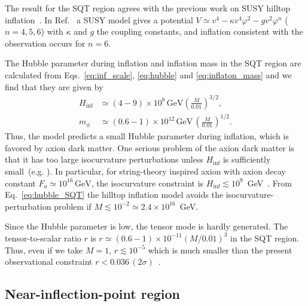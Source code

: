 \documentclass[11pt,a4paper]{article}
\begin{document}
The result for the SQT region agrees with the previous work on SUSY hilltop inflation~\cite{Harigaya:2013pla}.
In Ref.~\cite{Harigaya:2013pla} a SUSY model gives a potential $V\simeq v^4 -\kappa v^4\varphi^2 - gv^2 \varphi^n$ ($n=4,5,6$) with $\kappa$ and $g$ the coupling constants, and inflation consistent with the observation occurs for $n=6$.

The Hubble parameter during inflation and inflation mass in the SQT region are calculated from Eqs.~\eqref{eq:inf_scale}, \eqref{eq:hubble} and \eqref{eq:inflaton_mass} and we find that they are given by 
\begin{align}
    \label{eq:hubble_SQT}
    H_\mathrm{inf} & \simeq (4-9)\times 10^{8}\,\mathrm{GeV} \left(\frac{M}{0.01}\right)^{3/2}, \\
    \label{eq:inflaton_mass_SQT}
    m_\phi & \simeq (0.6-1)\times 10^{12}\, \mathrm{GeV}\,
    \left(\frac{M}{0.01}\right)^{1/2}.    
\end{align}
Thus, the model predicts a small Hubble parameter during inflation, which is favored by axion dark matter.
One serious problem of the axion dark matter is that it has too large isocurvature perturbations unless $H_\mathrm{inf}$ is sufficiently small~(e.g. \cite{Kawasaki:2013ae}).
In particular, for string-theory inspired axion with axion decay constant $F_a \simeq 10^{16}\,\mathrm{GeV}$, the isocurvature constraint is $H_\mathrm{inf} \lesssim 10^9$~GeV~\cite{Kawasaki:2015pva}.
From Eq.~\eqref{eq:hubble_SQT} the hilltop inflation model avoids the isocurvature-perturbation problem if $M \lesssim  10^{-2} \simeq 2.4 \times 10^{16}$~GeV. 


Since the Hubble parameter is low, the tensor mode is hardly generated.
The tensor-to-scalar ratio $r$ is $r \simeq (0.6-1)\times 10^{-11}(M/0.01)^3$ in the SQT region. 
Thus, even if we take $M=1$, $r \lesssim 10^{-5}$ which is much smaller than the present observational constraint $r < 0.036\,(2\sigma)$~\cite{BICEP:2021xfz}.

\subsection{Near-inflection-point region}
\label{subsec:NIP}
\end{document}
